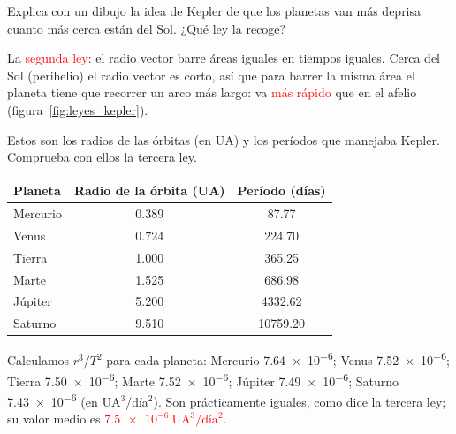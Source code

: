 \begin{exercise}
    Explica con un dibujo la idea de Kepler de que los planetas van más deprisa cuanto más cerca están del Sol. ¿Qué ley la recoge?
    \begin{solu}
        La \textcolor{red}{segunda ley}: el radio vector barre áreas iguales en tiempos iguales. Cerca del Sol (perihelio) el radio vector es corto, así que para barrer la misma área el planeta tiene que recorrer un arco más largo: va \textcolor{red}{más rápido} que en el afelio (figura~\ref{fig:leyes_kepler}).
    \end{solu}
\end{exercise}

\begin{exercise}
    Estos son los radios de las órbitas (en UA) y los períodos que manejaba Kepler. Comprueba con ellos la tercera ley.
    \begin{center}
        \begin{tabular}{@{}lcc@{}}
            \toprule
            \textbf{Planeta} & \textbf{Radio de la órbita (UA)} & \textbf{Período (días)} \\
            \midrule
            Mercurio & \num{0.389} & \num{87.77} \\[3pt]
            Venus & \num{0.724} & \num{224.70} \\[3pt]
            Tierra & \num{1.000} & \num{365.25} \\[3pt]
            Marte & \num{1.525} & \num{686.98} \\[3pt]
            Júpiter & \num{5.200} & \num{4332.62} \\[3pt]
            Saturno & \num{9.510} & \num{10759.20} \\
            \bottomrule
        \end{tabular}
    \end{center}
    \begin{solu}
        Calculamos \(r^3/T^2\) para cada planeta: Mercurio \num{7.64e-6}; Venus \num{7.52e-6}; Tierra \num{7.50e-6}; Marte \num{7.52e-6}; Júpiter \num{7.49e-6}; Saturno \num{7.43e-6} (en UA\(^3\)/día\(^2\)). Son prácticamente iguales, como dice la tercera ley; su valor medio es \textcolor{red}{\(\num{7.5e-6}~\text{UA}^3/\text{día}^2\)}.
    \end{solu}
\end{exercise}

